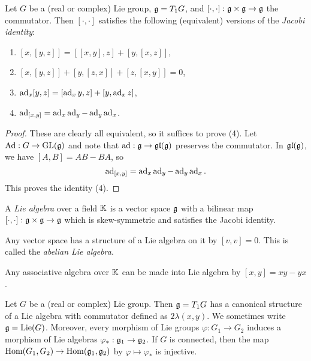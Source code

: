 \begin{theorem}\label{thm:jacobi}
  Let $G$ be a (real or complex)
  Lie group, $\mathfrak{g} = T_1 G$, and
  $[\cdot, \cdot] : \mathfrak{g} \times \mathfrak{g} \to \mathfrak{g}$
  the commutator.
  Then $[\cdot, \cdot]$ satisfies the
  following (equivalent) versions of
  the \emph{Jacobi identity}:
  \begin{enumerate}
    \item $[x, [y, z]] = [[x, y], z] + [y, [x, z]]$,
    \item $[x, [y, z]] + [y, [z, x]] + [z, [x, y]] = 0$,
    \item $\operatorname{ad}_x [y, z] = [\operatorname{ad}_x y, z] + [y, \operatorname{ad}_x z]$,
    \item $\operatorname{ad}_{[x, y]} = \operatorname{ad}_x \operatorname{ad}_y - \operatorname{ad}_y \operatorname{ad}_x$.
  \end{enumerate}
\end{theorem}

\begin{proof}
  These are clearly all equivalent,
  so it suffices to prove (4).
  Let $\operatorname{Ad} : G \to \operatorname{GL}(\mathfrak{g})$ and
  note that
  $\operatorname{ad} : \mathfrak{g} \to \mathfrak{gl}(\mathfrak{g})$ preserves
  the commutator. In $\mathfrak{gl}(\mathfrak{g})$, we have
  $[A, B] = AB - BA$, so
  \[
    \operatorname{ad}_{[x, y]}
    = \operatorname{ad}_x \operatorname{ad}_y - \operatorname{ad}_y \operatorname{ad}_x.
  \]
  This proves the identity (4).
\end{proof}

\begin{definition}
  A \emph{Lie algebra} over a field $\mathbb{K}$
  is a vector space $\mathfrak{g}$ with a
  bilinear map $[\cdot, \cdot] : \mathfrak{g} \times \mathfrak{g} \to \mathfrak{g}$
  which is skew-symmetric and
  satisfies the Jacobi identity.
\end{definition}

\begin{example}
  Any vector space has a structure of a
  Lie algebra on it by $[v, v] = 0$.
  This is called the \emph{abelian Lie algebra}.
\end{example}

\begin{example}
  Any associative algebra over $\mathbb{K}$
  can be made into Lie algebra
  by $[x, y] = xy - yx$.
\end{example}

\begin{theorem}
  Let $G$ be a (real or complex)
  Lie group. Then $\mathfrak{g} = T_1 G$ has a
  canonical structure of a Lie algebra
  with commutator defined as
  $2\lambda(x, y)$. We sometimes write
  $\mathfrak{g} = \operatorname{Lie}(G)$.
  Moreover, every morphism
  of Lie groups $\varphi : G_1 \to G_2$
  induces a morphism of Lie algebras
  $\varphi_* : \mathfrak{g}_1 \to \mathfrak{g}_2$.
  If $G$ is connected, then the
  map $\operatorname{Hom}(G_1, G_2) \to \operatorname{Hom}(\mathfrak{g}_1, \mathfrak{g}_2)$
  by $\varphi \mapsto \varphi_*$
  is injective.
\end{theorem}


